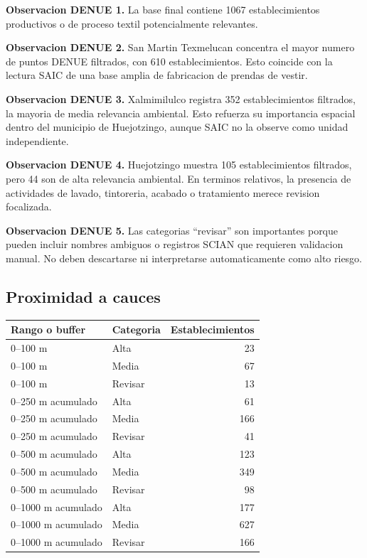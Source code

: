 \documentclass[11pt,letterpaper]{article}
\begin{document}
\textbf{Observacion DENUE 1.} La base final contiene 1067 establecimientos productivos o de proceso textil potencialmente relevantes.

\textbf{Observacion DENUE 2.} San Martin Texmelucan concentra el mayor numero de puntos DENUE filtrados, con 610 establecimientos. Esto coincide con la lectura SAIC de una base amplia de fabricacion de prendas de vestir.

\textbf{Observacion DENUE 3.} Xalmimilulco registra 352 establecimientos filtrados, la mayoria de media relevancia ambiental. Esto refuerza su importancia espacial dentro del municipio de Huejotzingo, aunque SAIC no la observe como unidad independiente.

\textbf{Observacion DENUE 4.} Huejotzingo muestra 105 establecimientos filtrados, pero 44 son de alta relevancia ambiental. En terminos relativos, la presencia de actividades de lavado, tintoreria, acabado o tratamiento merece revision focalizada.

\textbf{Observacion DENUE 5.} Las categorias ``revisar'' son importantes porque pueden incluir nombres ambiguos o registros SCIAN que requieren validacion manual. No deben descartarse ni interpretarse automaticamente como alto riesgo.

\subsection{Proximidad a cauces}

\begin{longtable}{p{4cm}p{2.6cm}r}
\toprule
Rango o buffer & Categoria & Establecimientos \\
\midrule
0--100 m & Alta & 23 \\
0--100 m & Media & 67 \\
0--100 m & Revisar & 13 \\
0--250 m acumulado & Alta & 61 \\
0--250 m acumulado & Media & 166 \\
0--250 m acumulado & Revisar & 41 \\
0--500 m acumulado & Alta & 123 \\
0--500 m acumulado & Media & 349 \\
0--500 m acumulado & Revisar & 98 \\
0--1000 m acumulado & Alta & 177 \\
0--1000 m acumulado & Media & 627 \\
0--1000 m acumulado & Revisar & 166 \\
\bottomrule
\end{longtable}
\end{document}
